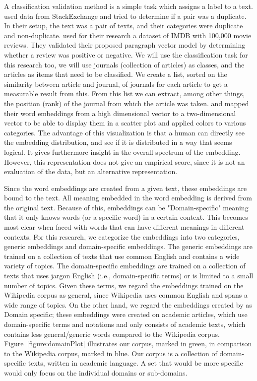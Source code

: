 \documentclass[../../Thesis.tex]{subfiles}
\begin{document}
\begin{jumpin}
A classification validation method is a simple task which assigns a label to a text. \citet{lau2016empirical} used data from StackExchange and tried to determine if a pair was a duplicate. In their setup, the text was a pair of texts, and their categories were duplicate and non-duplicate. \citet{le2014distributed} used for their research a dataset of IMDB with 100,000 movie reviews. They validated their proposed paragraph vector model by determining whether a review was positive or negative. We will use the classification task for this research too, we will use journals (collection of articles) as classes, and the articles as items that need to be classified. We create a list, sorted on the similarity between article and journal, of journals for each article to get a measurable result from this. From this list we can extract, among other things, the position (rank) of the journal from which the article was taken.
\citet{dai2015document} and \citet{hinton2003stochastic} mapped their word embeddings from a high dimensional vector to a two-dimensional vector to be able to display them in a scatter plot and applied colors to various categories. The advantage of this visualization is that a human can directly see the embedding distribution, and see if it is distributed in a way that seems logical. It gives furthermore insight in the overall spectrum of the embedding. However, this representation does not give an empirical score, since it is not an evaluation of the data, but an alternative representation. 
\end{jumpin}
Since the word embeddings are created from a given text, these embeddings are bound to the text. All meaning embedded in the word embedding is derived from the original text. Because of this, embeddings can be "Domain-specific" meaning that it only knows words (or a specific word) in a certain context. This becomes most clear when faced with words that can have different meanings in different contexts. For this research, we categorize the embeddings into two categories, generic embeddings and domain-specific embeddings. The generic embeddings are trained on a collection of texts that use common English and contains a wide variety of topics. The domain-specific embeddings are trained on a collection of texts that uses jargon English (i.e., domain-specific terms) or is limited to a small number of topics. Given these terms, we regard the embeddings trained on the Wikipedia corpus\cite{lai2016generate, pennington2014glove, dai2015document, lau2016empirical, schnabel2015evaluation} as general, since Wikipedia uses common English and spans a wide range of topics. On the other hand, we regard the embeddings created by \citet{Truong2017Thesis} as Domain specific; these embeddings were created on academic articles, which use domain-specific terms and notations and only consists of academic texts, which contains less general/generic words compared to the Wikipedia corpus. Figure~\ref{figure:domainPlot} illustrates our corpus, marked in green, in comparison to the Wikipedia corpus, marked in blue. Our corpus is a collection of domain-specific texts, written in academic language. A set that would be more specific would only focus on the individual domains or sub-domains.
\end{document}
